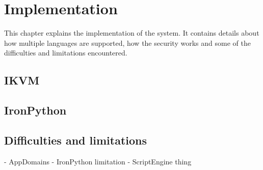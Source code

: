 \chapter{Implementation}
This chapter explains the implementation of the system. It contains details about how multiple languages are supported, how the security works and some of the difficulties and limitations encountered.








\section{IKVM}

\section{IronPython}

\section{Difficulties and limitations}
- AppDomains
- IronPython limitation
- ScriptEngine thing
